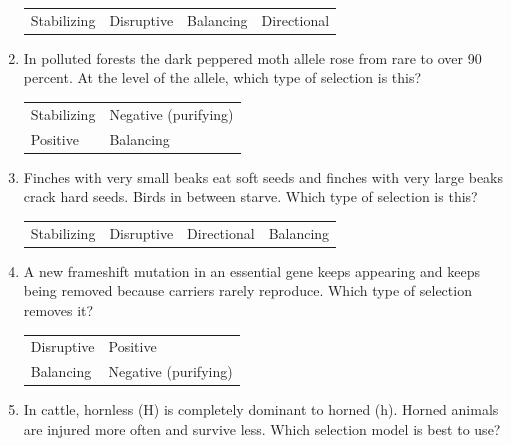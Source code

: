 \documentclass[11pt]{article}
\begin{document}
\begin{enumerate}[label=\textbf{\arabic*.}, leftmargin=2em, itemsep=1.4em]
\par\smallskip\noindent\begin{tabularx}{\linewidth}{@{}YYYY@{}}
Stabilizing & Disruptive & Balancing & Directional \\
\end{tabularx}
\item In polluted forests the dark peppered moth allele rose from rare to over 90 percent. At the level of the allele, which type of selection is this?
\par\smallskip\noindent\begin{tabularx}{\linewidth}{@{}YY@{}}
Stabilizing & Negative (purifying) \\[3pt]
Positive & Balancing \\
\end{tabularx}
\item Finches with very small beaks eat soft seeds and finches with very large beaks crack hard seeds. Birds in between starve. Which type of selection is this?
\par\smallskip\noindent\begin{tabularx}{\linewidth}{@{}YYYY@{}}
Stabilizing & Disruptive & Directional & Balancing \\
\end{tabularx}
\item A new frameshift mutation in an essential gene keeps appearing and keeps being removed because carriers rarely reproduce. Which type of selection removes it?
\par\smallskip\noindent\begin{tabularx}{\linewidth}{@{}YY@{}}
Disruptive & Positive \\[3pt]
Balancing & Negative (purifying) \\
\end{tabularx}
\item In cattle, hornless (H) is completely dominant to horned (h). Horned animals are injured more often and survive less. Which selection model is best to use?
\par\smallskip

\end{enumerate}
\end{document}
